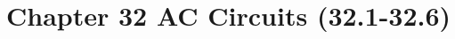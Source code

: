 \documentclass{article}
\begin{document}



\LARGE

\section*{Chapter 32 AC Circuits (32.1-32.6)}



\end{document}
